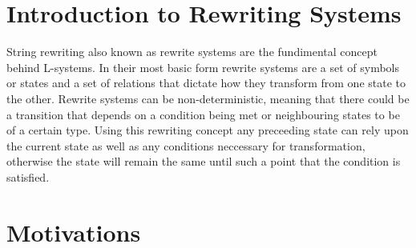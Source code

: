 \section{Introduction to Rewriting Systems}

\begin{flushleft}

String rewriting also known as rewrite systems are the fundimental concept behind L-systems. In their most basic form rewrite systems are a set of symbols or states and a set of relations that dictate how they transform from one state to the other. Rewrite systems can be non-deterministic, meaning that there could be a transition that depends on a condition being met or neighbouring states to be of a certain type. Using this rewriting concept any preceeding state can rely upon the current state as well as any conditions neccessary for transformation, otherwise the state will remain the same until such a point that the condition is satisfied. 

\end{flushleft}

\section{Motivations}
 

